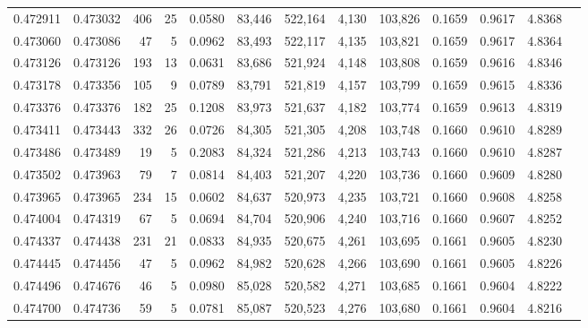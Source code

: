 \begin{tabular}{rrrrrrrrrrrrr}
0.472911 & 0.473032 &   406 &    25 &                                     0.0580 &  83,446 & 522,164 &   4,130 & 103,826 & 0.1659 & 0.9617 & 4.8368 \\
0.473060 & 0.473086 &    47 &     5 &                                     0.0962 &  83,493 & 522,117 &   4,135 & 103,821 & 0.1659 & 0.9617 & 4.8364 \\
0.473126 & 0.473126 &   193 &    13 &                                     0.0631 &  83,686 & 521,924 &   4,148 & 103,808 & 0.1659 & 0.9616 & 4.8346 \\
0.473178 & 0.473356 &   105 &     9 &                                     0.0789 &  83,791 & 521,819 &   4,157 & 103,799 & 0.1659 & 0.9615 & 4.8336 \\
0.473376 & 0.473376 &   182 &    25 &                                     0.1208 &  83,973 & 521,637 &   4,182 & 103,774 & 0.1659 & 0.9613 & 4.8319 \\
0.473411 & 0.473443 &   332 &    26 &                                     0.0726 &  84,305 & 521,305 &   4,208 & 103,748 & 0.1660 & 0.9610 & 4.8289 \\
0.473486 & 0.473489 &    19 &     5 &                                     0.2083 &  84,324 & 521,286 &   4,213 & 103,743 & 0.1660 & 0.9610 & 4.8287 \\
0.473502 & 0.473963 &    79 &     7 &                                     0.0814 &  84,403 & 521,207 &   4,220 & 103,736 & 0.1660 & 0.9609 & 4.8280 \\
0.473965 & 0.473965 &   234 &    15 &                                     0.0602 &  84,637 & 520,973 &   4,235 & 103,721 & 0.1660 & 0.9608 & 4.8258 \\
0.474004 & 0.474319 &    67 &     5 &                                     0.0694 &  84,704 & 520,906 &   4,240 & 103,716 & 0.1660 & 0.9607 & 4.8252 \\
0.474337 & 0.474438 &   231 &    21 &                                     0.0833 &  84,935 & 520,675 &   4,261 & 103,695 & 0.1661 & 0.9605 & 4.8230 \\
0.474445 & 0.474456 &    47 &     5 &                                     0.0962 &  84,982 & 520,628 &   4,266 & 103,690 & 0.1661 & 0.9605 & 4.8226 \\
0.474496 & 0.474676 &    46 &     5 &                                     0.0980 &  85,028 & 520,582 &   4,271 & 103,685 & 0.1661 & 0.9604 & 4.8222 \\
0.474700 & 0.474736 &    59 &     5 &                                     0.0781 &  85,087 & 520,523 &   4,276 & 103,680 & 0.1661 & 0.9604 & 4.8216 \\

\end{tabular}
